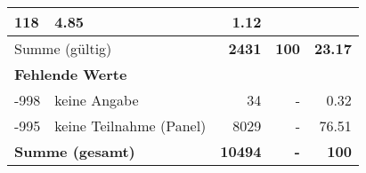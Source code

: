 \begin{longtable}{lXrrr}
       \num{118} &
       \num[round-mode=places,round-precision=2]{4,85} &
         \num[round-mode=places,round-precision=2]{1,12} \\
     \midrule
     \multicolumn{2}{l}{Summe (gültig)} &
       \textbf{\num{2431}} &
     \textbf{100} &
       \textbf{\num[round-mode=places,round-precision=2]{23,17}} \\
     \multicolumn{5}{l}{\textbf{Fehlende Werte}}\\
       -998 &
       keine Angabe &
         \num{34} &
        - &
         \num[round-mode=places,round-precision=2]{0,32} \\
       -995 &
       keine Teilnahme (Panel) &
         \num{8029} &
        - &
         \num[round-mode=places,round-precision=2]{76,51} \\
     \midrule
     \multicolumn{2}{l}{\textbf{Summe (gesamt)}} &
          \textbf{\num{10494}} &
        \textbf{-} &
        \textbf{100} \\
     \bottomrule
     \end{longtable}
     
